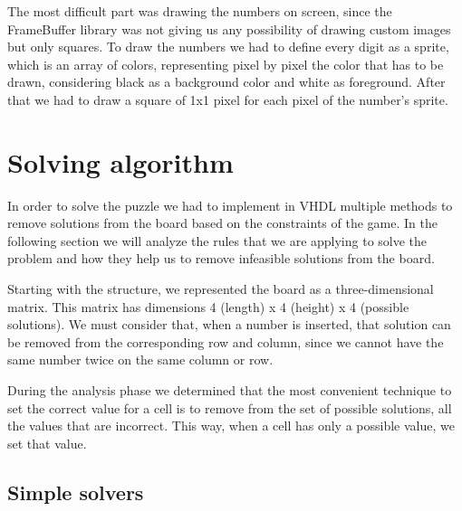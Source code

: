 \documentclass[12pt]{report}
\begin{document}
The most difficult part was drawing the numbers on screen, since the
FrameBuffer library was not giving us any possibility of drawing custom
images but only squares. To draw the numbers we had to define every digit
as a sprite, which is an array of colors, representing pixel by pixel the
color that has to be drawn, considering black as a background color and
white as foreground. After that we had to draw a square of 1x1 pixel for
each pixel of the number's sprite.

\chapter*{Solving algorithm}

In order to solve the puzzle we had to implement in VHDL multiple methods
to remove solutions from the board based on the constraints of the game. In
the following section we will analyze the rules that we are applying to
solve the problem and how they help us to remove infeasible solutions from
the board.

Starting with the structure, we represented the board as
a three-dimensional matrix. This matrix has dimensions 4 (length)
x 4 (height) x 4 (possible solutions). We must consider that, when
a number is inserted, that solution can be removed from the corresponding
row and column, since we cannot have the same number twice on the same
column or row.

During the analysis phase we determined that the most convenient technique
to set the correct value for a cell is to remove from the set of possible
solutions, all the values that are incorrect. This way, when a cell has
only a possible value, we set that value.

\section*{Simple solvers}
\end{document}
